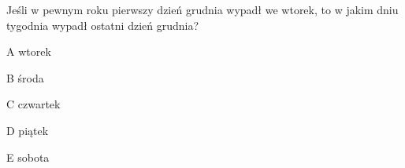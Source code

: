 \begin{tresc}
Jeśli w pewnym roku pierwszy dzień grudnia wypadł we wtorek, to w jakim dniu tygodnia wypadł ostatni dzień grudnia?
\end{tresc}
\begin{wariant}{A} wtorek \end{wariant}
\begin{wariant}{B} środa \end{wariant}
\begin{wariant}{C} czwartek \end{wariant}
\begin{wariant}{D} piątek \end{wariant}
\begin{wariant}{E} sobota \end{wariant}
